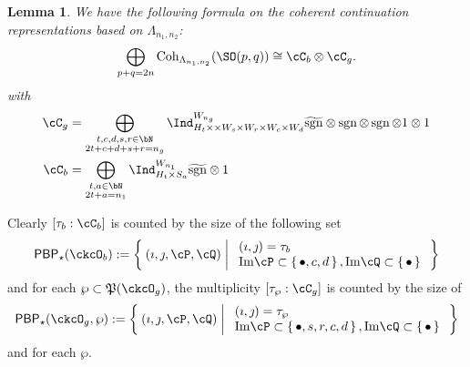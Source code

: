 \documentclass[12pt,a4paper]{amsart}
\def\Im{\operatorname{Im}}
\newcommand{\sgn}{\operatorname{sgn}}
\numberwithin{equation}{section}
\newtheorem{lem}[thm]{Lemma}
\theoremstyle{remark}
\def\Cint#1{\Coh_{[#1]}}
\def\Im{\mathrm{Im}}
\def\Coh{\mathrm{Coh}}
\def\CPP{\mathfrak{P}}
\def\hsgn{\widetilde{\mathrm{sgn}}}
\def\PBP{\mathsf{PBP}}
\begin{document}
\begin{lem}
  We have the following formula on the coherent continuation
  representations based on $\Lambda_{n_{1},n_{2}}$:
  \[
    \bigoplus_{p+q=2n} \Coh_{\Lambda_{n_1, n_2}}(\SO(p,q)) \cong \cC_{b}\otimes \cC_{g}.
  \]
  with
  \[
    \begin{split}
      \cC_g %
      &=\bigoplus_{\substack{t,c,d,s,r\in\bN\\2t+c+d+s+r=n_{g}}} \Ind_{H_{t} \times \times W_s\times W_r\times W_{c}\times W_{d} }^{W_{n_{g}}}
      \hsgn \otimes \sgn \otimes \sgn \otimes 1\otimes 1\\
      \cC_b & =
      \bigoplus_{\substack{t,a\in \bN\\2t+a=n_{1}}}
      \Ind_{H_{t}\times S_{a}}^{W_{n_{1}}} \hsgn\otimes 1
    \end{split}
  \]
\end{lem}


Clearly $[\tau_{b}:\cC_{b}]$ is counted by the size of the following set
\[
  \PBP_{\star}(\ckcO_b) := \Set{(\imath,\jmath,\cP,\cQ)| %
    \begin{array}{l}
      (\imath,\jmath) = \tau_{b}\\
      \Im \cP \subset \set{\bullet,c,d}, \Im \cQ \subset\set{\bullet}\\
    \end{array}
  }
\]
and for each $\wp\subset \CPP(\ckcO_{g})$, the multiplicity
$[\tau_{\wp}: \cC_{g}]$ is counted by the size of
\[
  \PBP_{\star}(\ckcO_g,\wp):= \Set{(\imath,\jmath,\cP,\cQ)| %
    \begin{array}{l}
      (\imath,\jmath) = \tau_{\wp}\\
      \Im \cP \subset \set{\bullet,s,r,c,d}, \Im \cQ \subset\set{\bullet}\\
    \end{array}
  }
\]
and for each $\wp$.
\end{document}
